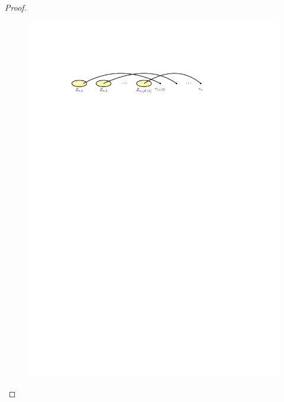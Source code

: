\documentclass[kpfonts]{patmorin}
\begin{document}
\begin{proof}
\begin{figure}[!h]
			\includegraphics{figs/median-1} \\[2em]

\end{figure}
\end{proof}
\end{document}
